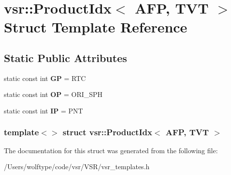 \hypertarget{structvsr_1_1_product_idx_3_01_a_f_p_00_01_t_v_t_01_4}{\section{vsr\-:\-:Product\-Idx$<$ A\-F\-P, T\-V\-T $>$ Struct Template Reference}
\label{structvsr_1_1_product_idx_3_01_a_f_p_00_01_t_v_t_01_4}
}
\subsection*{Static Public Attributes}
\begin{DoxyCompactItemize}
\item 
\hypertarget{structvsr_1_1_product_idx_3_01_a_f_p_00_01_t_v_t_01_4_a0c376815d312a48d49307d021c683f9e}{static const int {\bfseries G\-P} = R\-T\-C}\label{structvsr_1_1_product_idx_3_01_a_f_p_00_01_t_v_t_01_4_a0c376815d312a48d49307d021c683f9e}

\item 
\hypertarget{structvsr_1_1_product_idx_3_01_a_f_p_00_01_t_v_t_01_4_a8208ab6da9bb3bdb93e286f1fa472180}{static const int {\bfseries O\-P} = O\-R\-I\-\_\-\-S\-P\-H}\label{structvsr_1_1_product_idx_3_01_a_f_p_00_01_t_v_t_01_4_a8208ab6da9bb3bdb93e286f1fa472180}

\item 
\hypertarget{structvsr_1_1_product_idx_3_01_a_f_p_00_01_t_v_t_01_4_a97c28e38c5317c81fbcf797201dc89e0}{static const int {\bfseries I\-P} = P\-N\-T}\label{structvsr_1_1_product_idx_3_01_a_f_p_00_01_t_v_t_01_4_a97c28e38c5317c81fbcf797201dc89e0}

\end{DoxyCompactItemize}
\subsubsection*{template$<$$>$ struct vsr\-::\-Product\-Idx$<$ A\-F\-P, T\-V\-T $>$}



The documentation for this struct was generated from the following file\-:\begin{DoxyCompactItemize}
\item 
/\-Users/wolftype/code/vsr/\-V\-S\-R/vsr\-\_\-templates.\-h\end{DoxyCompactItemize}
